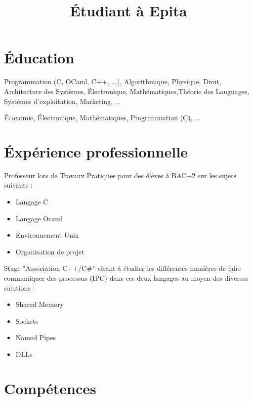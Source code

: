\documentclass[11pt,a4paper]{moderncv}
\title{\'{E}tudiant à Epita}
\begin{document}
\makecvtitle

\section{\'{E}ducation}

{Programmation (C, OCaml, C++, ...), Algorithmique, Physique, Droit,
    Architecture des Systèmes, \'{E}lectronique,
    Mathématiques,Théorie des Languages, Systèmes d'exploitation,
    Marketing, ... }

{\'{E}conomie, \'{E}lectronique, Mathématiques, Programmation (C), ...}

{}

\section{\'{E}xpérience professionnelle}

{Professeur lors de Travaux Pratiques pour des élèves à BAC+2 sur les sujets suivants :
\begin{itemize}
    \item{Langage C}
    \item{Langage Ocaml}
    \item{Environnement Unix}
    \item{Organisation de projet}
\end{itemize}
}

{Stage "Association C++/C\#" visant à étudier les différentes manières de faire
    communiquer des processus (IPC) dans ces deux langages au moyen des
    diverses solutions :
\begin{itemize}
    \item{Shared Memory}
    \item{Sockets}
    \item{Named Pipes}
    \item{DLLs}
\end{itemize}
}

\section{Compétences}
\end{document}
